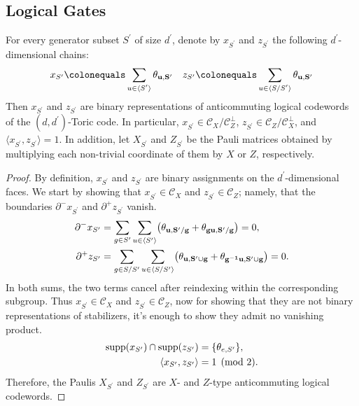 \subsection{Logical Gates}


\begin{claim}
  For every generator subset $S^{\prime}$ of size $d^{\prime}$, denote by $x_{S^{\prime}}$ and $z_{S^{\prime}}$ the following $d^{\prime}$-dimensional chains: 
\begin{equation*}
  \begin{split}
    x_{S^{\prime}}  \colonequals \sum_{u \in \expval*{S^{\prime}} }\rotfv{u}{S^{\prime}} \ \ \ z_{S^{\prime}} \colonequals \sum_{u \in \expval*{S/S^{\prime}} }\rotfv{u}{S^{\prime}} 
  \end{split}
\end{equation*}
Then $x_{S^{\prime}}$ and $z_{S^{\prime}}$ are binary representations of anticommuting logical codewords of the $(d,d^{\prime})$-Toric code. In particular, $x_{S^{\prime}} \in \mathcal{C}_{X}/\mathcal{C}_{Z}^{\perp}$, $z_{S^{\prime}} \in \mathcal{C}_{Z}/\mathcal{C}_{X}^{\perp}$, and $\langle x_{S^{\prime}}, z_{S^{\prime}} \rangle = 1$. In addition, let $X_{S^{\prime}}$ and $Z_{S^{\prime}}$ be the Pauli matrices obtained by multiplying each non-trivial coordinate of them by $X$ or $Z$, respectively.
\end{claim}
\begin{proof}
By definition, $x_{S^{\prime}}$ and $z_{S^{\prime}}$ are binary assignments on the $d^{\prime}$-dimensional faces. We start by showing that $x_{S^{\prime}} \in \mathcal{C}_{X}$ and $z_{S^{\prime}} \in \mathcal{C}_{Z}$; namely, that the boundaries $\partial^{-}x_{S^{\prime}}$ and $\partial^{+}z_{S^{\prime}}$ vanish.
\begin{align*}
  \partial^- x_{S'}
  &=\sum_{g\in S'}\sum_{u\in\langle S'\rangle}
    \bigl(\mathbf{\theta_{u ,S'/g} }+\mathbf{\theta_{gu ,S'/g} }\bigr)=0,\\
  \partial^+ z_{S'}
  &=\sum_{g\in S/S'}\sum_{u\in\langle S/S'\rangle}
    \bigl(\mathbf{\theta_{u ,S'\cup g} }+\mathbf{\theta_{g^{-1}u ,S'\cup g} }\bigr)=0.
\end{align*}
In both sums, the two terms cancel after reindexing within the corresponding subgroup.
Thus $x_{S^{\prime}} \in \mathcal{C}_{X}$ and $z_{S^{\prime}}\in \mathcal{C}_{Z}$, now for showing that they are not binary representations of stabilizers, it's enough to show they admit no vanishing product.  
\begin{equation*}
  \begin{split}
    \operatorname{supp}(x_{S'})\cap\operatorname{supp}(z_{S'})
    &=\{\theta_{e ,S'}\},\\
    \langle x_{S'},z_{S'}\rangle&=1\pmod 2.
  \end{split}
\end{equation*}
Therefore, the Paulis $X_{S^{\prime}}$ and $Z_{S^{\prime}}$ are $X$- and $Z$-type anticommuting logical codewords.
\end{proof}


